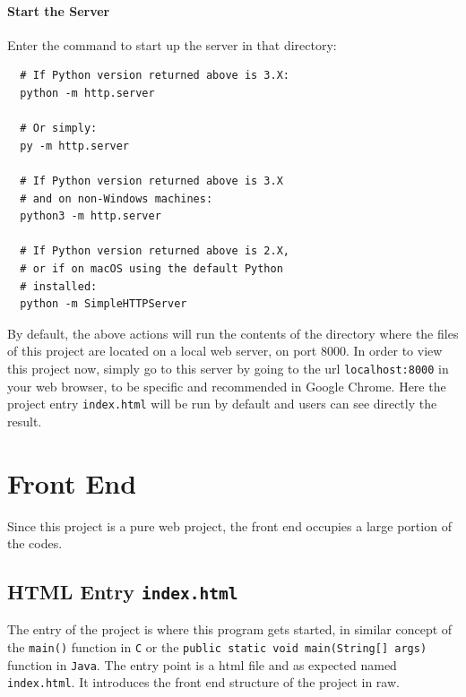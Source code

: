 \paragraph{Start the Server}

Enter the command to start up the server in that directory:

\begin{verbatim}
  # If Python version returned above is 3.X:
  python -m http.server
  
  # Or simply:
  py -m http.server

  # If Python version returned above is 3.X
  # and on non-Windows machines:
  python3 -m http.server

  # If Python version returned above is 2.X,
  # or if on macOS using the default Python
  # installed:
  python -m SimpleHTTPServer
\end{verbatim}

By default, the above actions will run the contents of the directory where the files of this project are located on a local web server, on port $8000$. In order to view this project now, simply go to this server by going to the \gls{url} \texttt{localhost:8000} in your web browser, to be specific and recommended in Google Chrome. Here the project entry \texttt{index.html} will be run by default and users can see directly the result.


\section{Front End}

Since this project is a pure web project, the front end occupies a large portion of the codes.

\subsection{HTML Entry \texttt{index.html}}

The entry of the project is where this program gets started, in similar concept of the \texttt{main()} function in \texttt{C} or the \texttt{public static void main(String[] args)} function in \texttt{Java}. The entry point is a \gls{html} file and as expected named \texttt{index.html}. It introduces the front end structure of the project in raw.

